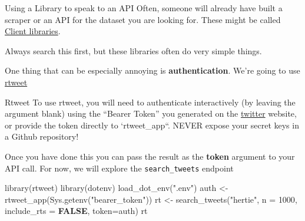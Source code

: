 \documentclass[
  10pt,
  ignorenonframetext,
  aspectratio=169]{beamer}
\newenvironment{Shaded}{\begin{snugshade}}{\end{snugshade}}
\newcommand{\AttributeTok}[1]{\textcolor[rgb]{0.80,0.80,0.80}{#1}}
\newcommand{\ConstantTok}[1]{\textcolor[rgb]{0.86,0.64,0.64}{\textbf{#1}}}
\newcommand{\DecValTok}[1]{\textcolor[rgb]{0.86,0.86,0.80}{#1}}
\newcommand{\FunctionTok}[1]{\textcolor[rgb]{0.94,0.94,0.56}{#1}}
\newcommand{\NormalTok}[1]{\textcolor[rgb]{0.80,0.80,0.80}{#1}}
\newcommand{\OtherTok}[1]{\textcolor[rgb]{0.94,0.94,0.56}{#1}}
\newcommand{\StringTok}[1]{\textcolor[rgb]{0.80,0.58,0.58}{#1}}
\begin{document}
\begin{frame}{Using a Library to speak to an API}
\protect\hypertarget{using-a-library-to-speak-to-an-api}{}
Often, someone will already have built a scraper or an API for the
dataset you are looking for. These might be called
\href{https://docs.openalex.org/api\#client-libraries}{Client
libraries}.

Always search this first, but these libraries often do very simple
things.

One thing that can be especially annoying is \textbf{authentication}.
We're going to use
\href{https://cbail.github.io/textasdata/apis/rmarkdown/Application_Programming_interfaces.html}{rtweet}
\end{frame}

\begin{frame}[fragile]{Rtweet}
\protect\hypertarget{rtweet}{}
To use rtweet, you will need to authenticate interactively (by leaving
the argument blank) using the ``Bearer Token'' you generated on the
\href{https://developer.twitter.com/en/portal/apps/}{twitter} website,
or provide the token directly to `rtweet\_app``. NEVER expose your
secret keys in a Github repository!

Once you have done this you can pass the result as the \textbf{token}
argument to your API call. For now, we will explore the
\texttt{search\_tweets} endpoint

\scriptsize

\begin{Shaded}
\begin{Highlighting}[]
\FunctionTok{library}\NormalTok{(rtweet)}
\FunctionTok{library}\NormalTok{(dotenv)}
\FunctionTok{load\_dot\_env}\NormalTok{(}\StringTok{".env"}\NormalTok{)}
\NormalTok{auth }\OtherTok{\textless{}{-}} \FunctionTok{rtweet\_app}\NormalTok{(}\FunctionTok{Sys.getenv}\NormalTok{(}\StringTok{"bearer\_token"}\NormalTok{))}
\NormalTok{rt }\OtherTok{\textless{}{-}} \FunctionTok{search\_tweets}\NormalTok{(}\StringTok{"hertie"}\NormalTok{, }\AttributeTok{n =} \DecValTok{1000}\NormalTok{, }\AttributeTok{include\_rts =} \ConstantTok{FALSE}\NormalTok{, }\AttributeTok{token=}\NormalTok{auth)}
\NormalTok{rt}
\end{Highlighting}
\end{Shaded}


\end{frame}
\end{document}
